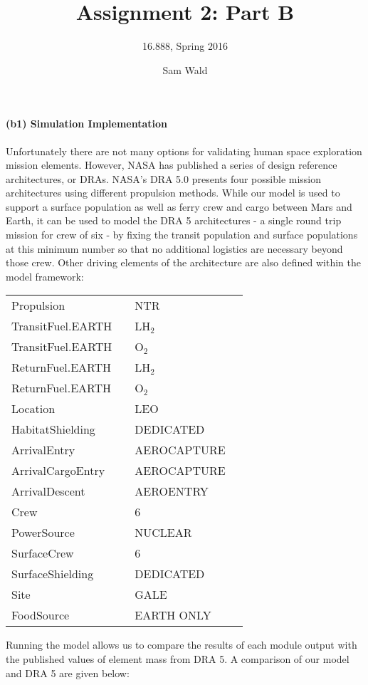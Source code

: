 \documentclass[]{scrartcl}
\title{Assignment 2: Part B}
\subtitle{16.888, Spring 2016}
\author{Sam Wald}
\date{}
\begin{document}
\maketitle

\paragraph{(b1) Simulation Implementation} \hfill \break
Unfortunately there are not many options for validating human space exploration mission elements. However, NASA has published a series of design reference architectures, or DRAs. NASA's DRA 5.0 presents four possible mission architectures using different propulsion methods. While our model is used to support a surface population as well as ferry crew and cargo between Mars and Earth, it can be used to model the DRA 5 architectures - a single round trip mission for crew of six - by fixing the transit population and surface populations at this minimum number so that no additional logistics are necessary beyond those crew. Other driving elements of the architecture are also defined within the model framework: 
\begin{center}
	\begin{tabular}{ lc lc}
Propulsion && NTR \\
TransitFuel.EARTH && LH$_2$\\
TransitFuel.EARTH && O$_2$\\
ReturnFuel.EARTH && LH$_2$\\
ReturnFuel.EARTH && O$_2$\\
Location && LEO\\
HabitatShielding && DEDICATED\\
ArrivalEntry && AEROCAPTURE\\
ArrivalCargoEntry && AEROCAPTURE\\
ArrivalDescent && AEROENTRY\\
Crew && 6\\
PowerSource && NUCLEAR\\
SurfaceCrew && 6\\
SurfaceShielding && DEDICATED\\
Site && GALE\\
FoodSource && EARTH ONLY\\
\end{tabular}
\end{center}
Running the model allows us to compare the results of each module output with the published values of element mass from DRA 5. A comparison of our model and DRA 5 are given below:
\end{document}
